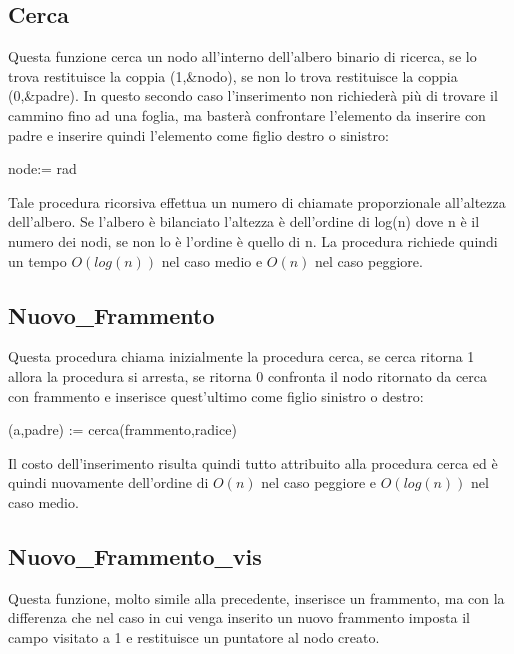 \documentclass[a4paper,10pt]{article}
\begin{document}
\subsection{Cerca}
Questa funzione cerca un nodo all'interno dell'albero binario di ricerca, se lo trova restituisce la coppia (1,\&{}nodo), se non lo trova restituisce la coppia (0,\&{}padre). In questo secondo caso l'inserimento non richiederà più di trovare il cammino fino ad una foglia, ma basterà confrontare l'elemento da inserire con padre e inserire quindi l'elemento come figlio destro o sinistro:

\begin{algorithm}[H]
node:= rad\;
\end{algorithm}
Tale procedura ricorsiva effettua un numero di chiamate proporzionale all'altezza dell'albero. Se l'albero è bilanciato l'altezza è dell'ordine di log(n) dove n è il numero dei nodi, se non lo è l'ordine è quello di n. La procedura richiede quindi un tempo $O(log(n))$ nel caso medio e $O(n)$ nel caso peggiore.
\subsection{Nuovo\_{}Frammento}
Questa procedura chiama inizialmente la procedura cerca, se cerca ritorna 1 allora la procedura si arresta, se ritorna 0 confronta il nodo ritornato da cerca con frammento e inserisce quest'ultimo come figlio sinistro o destro:

\begin{algorithm}[H]
(a,padre) := cerca(frammento,radice)\;
\end{algorithm}
Il costo dell'inserimento risulta quindi tutto attribuito alla procedura cerca ed è quindi nuovamente dell'ordine di $O(n)$ nel caso peggiore e $O(log(n))$ nel caso medio.
\subsection{Nuovo\_{}Frammento\_{}vis}
Questa funzione, molto simile alla precedente, inserisce un frammento, ma con la differenza che nel caso in cui venga inserito un nuovo frammento imposta il campo visitato a 1 e restituisce un puntatore al nodo creato.
\end{document}
